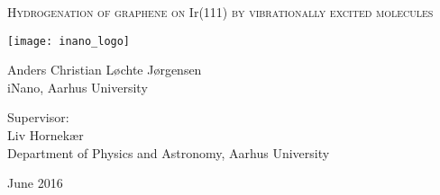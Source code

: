 
\begin{titlingpage}

\begin{center}

\vspace*{0cm}
\huge
\textsc{Hydrogenation of graphene on I}r\textsc{(111) by vibrationally excited molecules}\\
\vspace{1.5cm}

\vspace{3cm}
\texttt{[image: inano\_logo]}
\vspace{4cm}

\large
{
    Anders Christian Løchte Jørgensen\\
    iNano, Aarhus University
}

\vspace{1.5cm}

{
  Supervisor:\\
  Liv Hornekær\\
  Department of Physics and Astronomy, Aarhus University
}

\vspace{1.5cm}
{June 2016}\\


\end{center}



\end{titlingpage}
